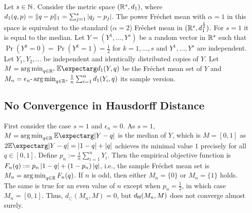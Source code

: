 Let $s\in\mathbb{N}$. Consider the metric space $(\mathbb{R}^s, d_1)$, where $d_1(q,p) = \Vert q-p \Vert_1 = \sum_{j=1}^s \left| q_j-p_j \right|$. The power Fréchet mean with $\alpha=1$ in this space is equivalent to the standard ($\alpha=2$) Fréchet mean in $(\mathbb{R}^s, d_1^{\frac12})$. For $s=1$ it is equal to the median.
Let $Y = (Y^1,\dots, Y^s)$ be a random vector in $\mathbb{R}^s$ such that $\Pr(Y^k=0)=\Pr(Y^k=1)=\frac12$ for $k=1,\dots, s$ and $Y^1,\dots, Y^s$ are independent. Let $Y_1, Y_2,\dots$ be independent and identically distributed copies of $Y$. Let $M = \argmin_{q\in\R^s}\Ex{d_1(Y, q)}$ be the Fréchet mean set of $Y$ and $M_n = \epsilon_n\text{-}\operatorname*{arg\,min}_{q\in\mathbb{R}^s}\frac1n\sum_{i=1}^n d_1(Y_i, q)$ its sample version.

\subsection{No Convergence in Hausdorff Distance}
First consider the case $s=1$ and $\epsilon_n=0$.
As $s=1$,  $M = \argmin_{q\in\R} \Ex{\abs{Y-q}}$ is the median of $Y$, which is $M = [0,1]$ as $2\Ex{\abs{Y-q}} = \abs{1-q}+\abs{q}$ achieves its minimal value $1$ precisely for all $q\in[0,1]$.
Define $p_n := \frac1n \sum_{i=1}^n Y_i$. Then the empirical objective function is $F_n(q) := p_n\left| 1-q \right|+(1-p_n)\left| q \right|$, i.e., the sample Fréchet mean set is $M_n = \operatorname*{arg\,min}_{q\in\mathbb{R}} F_n(q)$.
If $n$ is odd, then either $M_n = \{0\}$ or $M_n = \{1\}$ holds. The same is true for an even value of $n$ except when $p_n=\frac12$, in which case $M_n=[0,1]$.
Thus, $d_{\subset}(M_n, M) = 0$, but $d_{\mathsf{H}}(M_n, M)$ does not converge almost surely.

